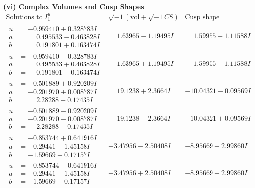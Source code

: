 \documentclass[1p]{elsarticle_modified}
\theoremstyle{definition}
\newcommand{\I}{\sqrt{-1}}
\begin{document}
\newpage\flushleft \textbf{(vi) Complex Volumes and Cusp Shapes}
$$\begin{array}{c|c|c}  
\text{Solutions to }I^u_{1}& \I (\text{vol} + \sqrt{-1}CS) & \text{Cusp shape}\\
 \hline 
\begin{aligned}
u &= -0.959410 + 0.328783 I \\
a &= \phantom{-}0.495533 - 0.463828 I \\
b &= \phantom{-}0.191801 + 0.163474 I\end{aligned}
 & \phantom{-}1.63965 - 1.19495 I & \phantom{-}1.59955 + 1.11588 I \\ \hline\begin{aligned}
u &= -0.959410 - 0.328783 I \\
a &= \phantom{-}0.495533 + 0.463828 I \\
b &= \phantom{-}0.191801 - 0.163474 I\end{aligned}
 & \phantom{-}1.63965 + 1.19495 I & \phantom{-}1.59955 - 1.11588 I \\ \hline\begin{aligned}
u &= -0.501889 + 0.920209 I \\
a &= -0.201970 + 0.008787 I \\
b &= \phantom{-}2.28288 - 0.17435 I\end{aligned}
 & \phantom{-}19.1238 + 2.3664 I & -10.04321 - 0.09569 I \\ \hline\begin{aligned}
u &= -0.501889 - 0.920209 I \\
a &= -0.201970 - 0.008787 I \\
b &= \phantom{-}2.28288 + 0.17435 I\end{aligned}
 & \phantom{-}19.1238 - 2.3664 I & -10.04321 + 0.09569 I \\ \hline\begin{aligned}
u &= -0.853744 + 0.641916 I \\
a &= -0.29441 + 1.45158 I \\
b &= -1.59669 - 0.17157 I\end{aligned}
 & -3.47956 - 2.50408 I & -8.95669 + 2.99860 I \\ \hline\begin{aligned}
u &= -0.853744 - 0.641916 I \\
a &= -0.29441 - 1.45158 I \\
b &= -1.59669 + 0.17157 I\end{aligned}
 & -3.47956 + 2.50408 I & -8.95669 - 2.99860 I \\ \hline\begin{aligned}

\end{aligned}
\end{array}$$
\end{document}
